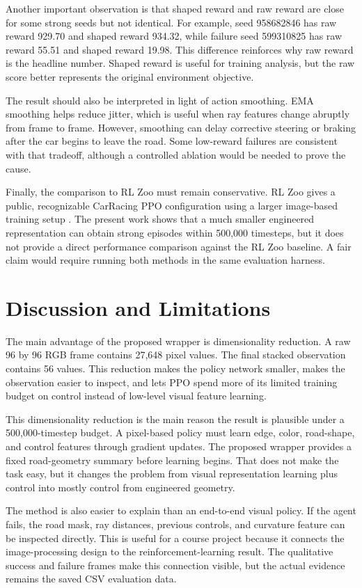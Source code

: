 \documentclass[conference]{IEEEtran}
\begin{document}
Another important observation is that shaped reward and raw reward are close for some strong seeds but not identical. For example, seed 958682846 has raw reward 929.70 and shaped reward 934.32, while failure seed 599310825 has raw reward 55.51 and shaped reward 19.98. This difference reinforces why raw reward is the headline number. Shaped reward is useful for training analysis, but the raw score better represents the original environment objective.

The result should also be interpreted in light of action smoothing. EMA smoothing helps reduce jitter, which is useful when ray features change abruptly from frame to frame. However, smoothing can delay corrective steering or braking after the car begins to leave the road. Some low-reward failures are consistent with that tradeoff, although a controlled ablation would be needed to prove the cause.

Finally, the comparison to RL Zoo must remain conservative. RL Zoo gives a public, recognizable CarRacing PPO configuration using a larger image-based training setup \cite{ref5}. The present work shows that a much smaller engineered representation can obtain strong episodes within 500,000 timesteps, but it does not provide a direct performance comparison against the RL Zoo baseline. A fair claim would require running both methods in the same evaluation harness.

\section{Discussion and Limitations}

The main advantage of the proposed wrapper is dimensionality reduction. A raw 96 by 96 RGB frame contains 27,648 pixel values. The final stacked observation contains 56 values. This reduction makes the policy network smaller, makes the observation easier to inspect, and lets PPO spend more of its limited training budget on control instead of low-level visual feature learning.

This dimensionality reduction is the main reason the result is plausible under a 500,000-timestep budget. A pixel-based policy must learn edge, color, road-shape, and control features through gradient updates. The proposed wrapper provides a fixed road-geometry summary before learning begins. That does not make the task easy, but it changes the problem from visual representation learning plus control into mostly control from engineered geometry.

The method is also easier to explain than an end-to-end visual policy. If the agent fails, the road mask, ray distances, previous controls, and curvature feature can be inspected directly. This is useful for a course project because it connects the image-processing design to the reinforcement-learning result. The qualitative success and failure frames make this connection visible, but the actual evidence remains the saved CSV evaluation data.
\end{document}
